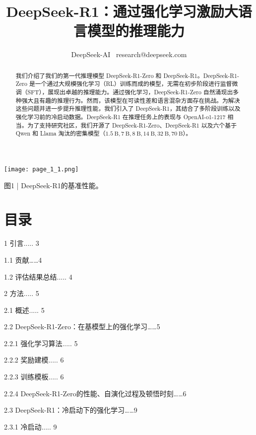 \documentclass[12pt,a4paper]{report} %
\begin{document}
\title{DeepSeek-R1：通过强化学习激励大语言模型的推理能力}


\author{DeepSeek-AI \ research@deepseek.com}


\maketitle
\begin{abstract}


我们介绍了我们的第一代推理模型 DeepSeek-R1-Zero 和 DeepSeek-R1。DeepSeek-R1-Zero 是一个通过大规模强化学习（RL）训练而成的模型，无需在初步阶段进行监督微调（SFT），展现出卓越的推理能力。通过强化学习，DeepSeek-R1-Zero 自然涌现出多种强大且有趣的推理行为。然而，该模型在可读性差和语言混杂方面存在挑战。为解决这些问题并进一步提升推理性能，我们引入了 DeepSeek-R1，其结合了多阶段训练以及强化学习前的冷启动数据。DeepSeek-R1 在推理任务上的表现与 OpenAI-o1-1217 相当。为了支持研究社区，我们开源了 DeepSeek-R1-Zero、DeepSeek-R1 以及六个基于 Qwen 和 Llama 淘汰的密集模型（$1.5 \mathrm{~B}, 7 \mathrm{~B}, 8 \mathrm{~B}, 14 \mathrm{~B}, 32 \mathrm{~B}, 70 \mathrm{~B}$）。\end{abstract}


\begin{center}
\texttt{[image: page\_1\_1.png]}
\end{center}
\begin{center}


图1 | DeepSeek-R1的基准性能。


\end{center}
\section*{目录}


1 引言..... 3


1.1 贡献……4


1.2 评估结果总结..... 4


2 方法..... 5


2.1 概述..... 5


2.2 DeepSeek-R1-Zero：在基模型上的强化学习……5


2.2.1 强化学习算法..... 5


2.2.2 奖励建模..... 6


2.2.3 训练模板..... 6


2.2.4 DeepSeek-R1-Zero的性能、自演化过程及顿悟时刻……6


2.3 DeepSeek-R1：冷启动下的强化学习……9


2.3.1 冷启动..... 9
\end{document}
